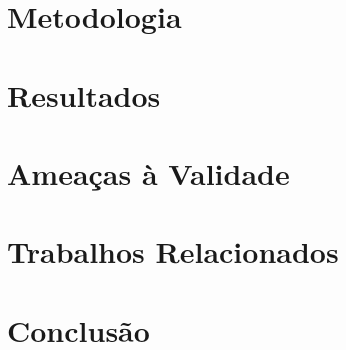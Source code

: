 \documentclass[12pt]{article}
\begin{document}
\section{Metodologia}
\label{sec:metodologia}

\section{Resultados}
\label{sec:resultados}

\section{Ameaças à Validade}
\label{sec:ameacas}

\section{Trabalhos Relacionados}
\label{sec:trabalhos-relacionados}

\section{Conclusão}
\label{sec:conclusao}


\end{document}
